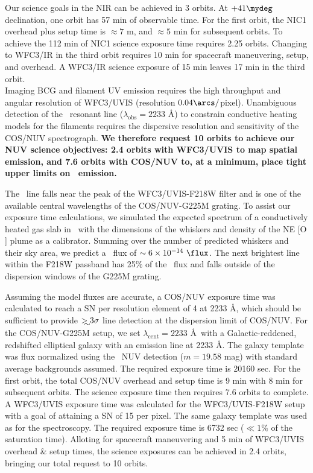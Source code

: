 \documentclass[12pt]{article}
\begin{document}
Our science goals in the NIR can be achieved in 3 orbits. At
$+41\mydeg$ declination, one orbit has 57 min of observable time. For
the first orbit, the NIC1 overhead plus setup time is $\approx 7$ m,
and $\approx 5$ min for subsequent orbits. To achieve the 112 min of
NIC1 science exposure time requires 2.25 orbits. Changing to WFC3/IR
in the third orbit requires 10 min for spacecraft maneuvering, setup,
and overhead. A WFC3/IR science exposure of 15 min leaves 17 min in
the third orbit.\\

 Imaging BCG and filament UV emission requires the
high throughput and angular resolution of WFC3/UVIS (resolution
$0.04\arcs/$pixel). Unambiguous detection of the \civ\ resonant line
($\lambda_{\mathrm{obs}} = 2233$ \AA) to constrain conductive heating
models for the filaments requires the dispersive resolution and
sensitivity of the COS/NUV spectrograph. {\bf{We therefore request 10
    orbits to achieve our NUV science objectives: 2.4 orbits with
    WFC3/UVIS to map spatial emission, and 7.6 orbits with COS/NUV to,
    at a minimum, place tight upper limits on \civ\ emission.}}

The \civ\ line falls near the peak of the WFC3/UVIS-F218W filter and
is one of the available central wavelengths of the COS/NUV-G225M
grating. To assist our exposure time calculations, we simulated the
expected spectrum of a conductively heated gas slab in \cloudy\ with
the dimensions of the whiskers and density of the NE [O ]
plume as a calibrator. Summing over the number of predicted whiskers
and their sky area, we predict a \civ\ flux of $\sim 6\times10^{-14}
~\flux$. The next brightest line within the F218W passband has 25\% of
the \civ\ flux and falls outside of the dispersion windows of the
G225M grating.

Assuming the model fluxes are accurate, a COS/NUV exposure time was
calculated to reach a SN per resolution element of 4 at 2233 \AA,
which should be sufficient to provide $\ga 3\sigma$ line detection at
the dispersion limit of COS/NUV. For the COS/NUV-G225M setup, we set
$\lambda_{\mathrm{cent}} = 2233$ \AA\ with a Galactic-reddened,
redshifted elliptical galaxy with an emission line at 2233 \AA. The
galaxy template was flux normalized using the \galex\ NUV detection
($m = 19.58$ mag) with standard average backgrounds assumed. The
required exposure time is 20160 sec. For the first orbit, the total
COS/NUV overhead and setup time is 9 min with 8 min for subsequent
orbits. The science exposure time then requires 7.6 orbits to
complete. A WFC3/UVIS exposure time was calculated for the
WFC3/UVIS-F218W setup with a goal of attaining a SN of 15 per
pixel. The same galaxy template was used as for the spectroscopy. The
required exposure time is 6732 sec ($\ll 1\%$ of the saturation
time). Alloting for spacecraft maneuvering and 5 min of WFC3/UVIS
overhead \& setup times, the science exposures can be achieved in 2.4
orbits, bringing our total request to 10 orbits.
\end{document}
